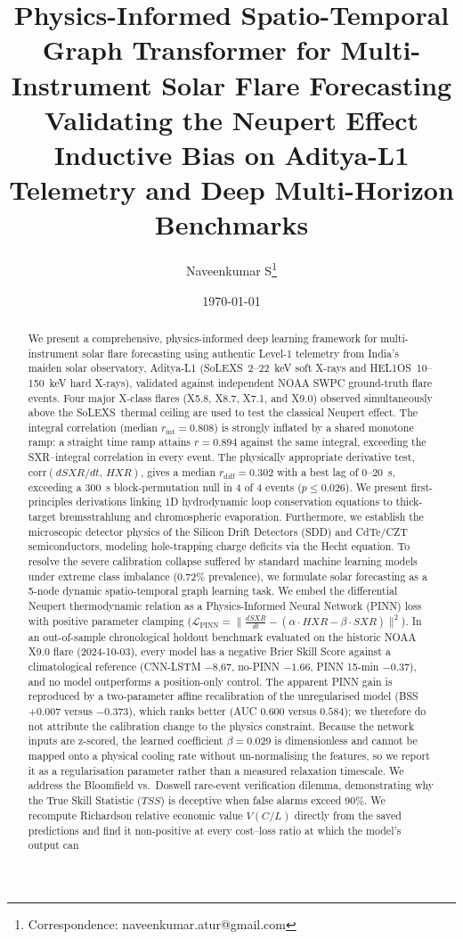 \documentclass[11pt,a4paper,twocolumn]{article}
\title{
    \vspace{1em}
    \Large\textbf{Physics-Informed Spatio-Temporal Graph Transformer for Multi-Instrument Solar Flare Forecasting}\\
    \vspace{0.5em}
    \normalsize Validating the Neupert Effect Inductive Bias on Aditya-L1 Telemetry and Deep Multi-Horizon Benchmarks
}
\author{Naveenkumar S\thanks{Correspondence: naveenkumar.atur@gmail.com}}
\affil{Space Weather and Machine Learning Laboratory, Bengaluru 560017, India}
\date{\today}
\newcommand{\solexs}{SoLEXS}
\newcommand{\helos}{HEL1OS}
\newcommand{\rint}{0.808}
\newcommand{\rdiff}{0.302}
\newcommand{\rintramp}{0.894}
\begin{document}
\pagestyle{empty}

\maketitle
\thispagestyle{empty}

\begin{abstract}
\noindent We present a comprehensive, physics-informed deep learning framework for multi-instrument solar flare forecasting using authentic Level-1 telemetry from India's maiden solar observatory, Aditya-L1 (\solexs\ 2--22~keV soft X-rays and \helos\ 10--150~keV hard X-rays), validated against independent NOAA SWPC ground-truth flare events. Four major X-class flares (X5.8, X8.7, X7.1, and X9.0) observed simultaneously above the \solexs\ thermal ceiling are used to test the classical Neupert effect. The integral correlation (median $r_{\mathrm{int}} = \rint$) is strongly inflated by a shared monotone ramp: a straight time ramp attains $r = \rintramp$ against the same integral, exceeding the SXR--integral correlation in every event. The physically appropriate derivative test, $\mathrm{corr}(dSXR/dt,\, HXR)$, gives a median $r_{\mathrm{diff}} = \rdiff$ with a best lag of $0$--$20$~s, exceeding a 300~s block-permutation null in 4 of 4 events ($p \le 0.026$). We present first-principles derivations linking 1D hydrodynamic loop conservation equations to thick-target bremsstrahlung and chromospheric evaporation. Furthermore, we establish the microscopic detector physics of the Silicon Drift Detectors (SDD) and CdTe/CZT semiconductors, modeling hole-trapping charge deficits via the Hecht equation. To resolve the severe calibration collapse suffered by standard machine learning models under extreme class imbalance ($0.72\%$ prevalence), we formulate solar forecasting as a 5-node dynamic spatio-temporal graph learning task. We embed the differential Neupert thermodynamic relation as a Physics-Informed Neural Network (PINN) loss with positive parameter clamping ($\mathcal{L}_{\mathrm{PINN}} = \|\frac{dSXR}{dt} - (\alpha \cdot HXR - \beta \cdot SXR)\|^2$). In an out-of-sample chronological holdout benchmark evaluated on the historic NOAA X9.0 flare (2024-10-03), every model has a negative Brier Skill Score against a climatological reference (CNN-LSTM $-8.67$, no-PINN $-1.66$, PINN 15-min $-0.37$), and no model outperforms a position-only control. The apparent PINN gain is reproduced by a two-parameter affine recalibration of the unregularised model (BSS $+0.007$ versus $-0.373$), which ranks better (AUC $0.600$ versus $0.584$); we therefore do not attribute the calibration change to the physics constraint. Because the network inputs are z-scored, the learned coefficient $\beta = 0.029$ is dimensionless and cannot be mapped onto a physical cooling rate without un-normalising the features, so we report it as a regularisation parameter rather than a measured relaxation timescale. We address the Bloomfield vs.\ Doswell rare-event verification dilemma, demonstrating why the True Skill Statistic ($TSS$) is deceptive when false alarms exceed 90\%. We recompute Richardson relative economic value $V(C/L)$ directly from the saved predictions and find it non-positive at every cost--loss ratio at which the model's output can 
\end{abstract}
\end{document}
